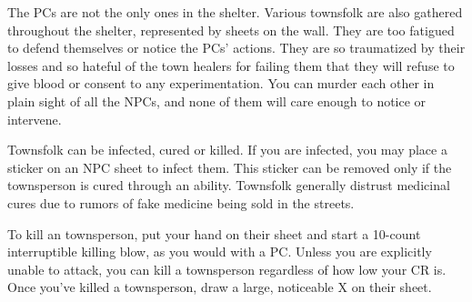 \documentclass[green]{Pestilence}
\begin{document}
\name{\gTownsfolk{}}

The PCs are not the only ones in the shelter. Various townsfolk are also gathered throughout the shelter, represented by sheets on the wall. They are too fatigued to defend themselves or notice the PCs' actions. They are so traumatized by their losses and so hateful of the town healers for failing them that they will refuse to give blood or consent to any experimentation. You can murder each other in plain sight of all the NPCs, and none of them will care enough to notice or intervene.

Townsfolk can be infected, cured or killed. If you are infected, you may place a sticker on an NPC sheet to infect them. This sticker can be removed only if the townsperson is cured through an ability. Townsfolk generally distrust medicinal cures due to rumors of fake medicine being sold in the streets.

To kill an townsperson, put your hand on their sheet and start a 10-count interruptible killing blow, as you would with a PC. Unless you are explicitly unable to attack, you can kill a townsperson regardless of how low your CR is. Once you've killed a townsperson, draw a large, noticeable X on their sheet.
\end{document}
